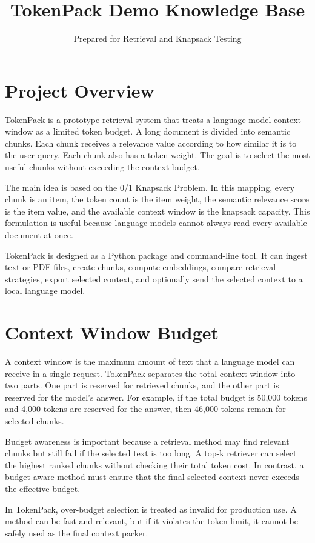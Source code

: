 \documentclass[11pt]{article}
\title{TokenPack Demo Knowledge Base}
\author{Prepared for Retrieval and Knapsack Testing}
\date{}
\begin{document}
\maketitle

\section{Project Overview}
TokenPack is a prototype retrieval system that treats a language model context window as a limited token budget. A long document is divided into semantic chunks. Each chunk receives a relevance value according to how similar it is to the user query. Each chunk also has a token weight. The goal is to select the most useful chunks without exceeding the context budget.

The main idea is based on the 0/1 Knapsack Problem. In this mapping, every chunk is an item, the token count is the item weight, the semantic relevance score is the item value, and the available context window is the knapsack capacity. This formulation is useful because language models cannot always read every available document at once.

TokenPack is designed as a Python package and command-line tool. It can ingest text or PDF files, create chunks, compute embeddings, compare retrieval strategies, export selected context, and optionally send the selected context to a local language model.

\section{Context Window Budget}
A context window is the maximum amount of text that a language model can receive in a single request. TokenPack separates the total context window into two parts. One part is reserved for retrieved chunks, and the other part is reserved for the model's answer. For example, if the total budget is 50,000 tokens and 4,000 tokens are reserved for the answer, then 46,000 tokens remain for selected chunks.

Budget awareness is important because a retrieval method may find relevant chunks but still fail if the selected text is too long. A top-k retriever can select the highest ranked chunks without checking their total token cost. In contrast, a budget-aware method must ensure that the final selected context never exceeds the effective budget.

In TokenPack, over-budget selection is treated as invalid for production use. A method can be fast and relevant, but if it violates the token limit, it cannot be safely used as the final context packer.
\end{document}
